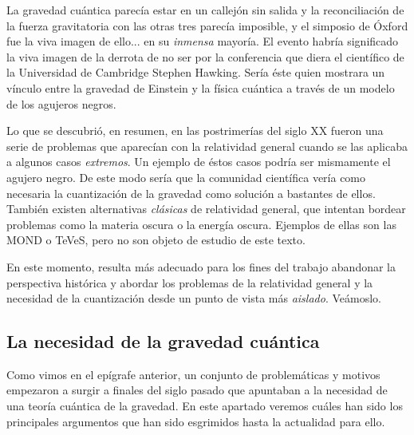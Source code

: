 \documentclass[11pt,a4paper,titlepage]{article}
\begin{document}
La gravedad cuántica parecía estar en un callejón sin salida y la reconciliación de la fuerza gravitatoria con las otras tres parecía imposible, y el simposio de Óxford fue la viva imagen de ello... en su \textit{inmensa} mayoría. El evento habría significado la viva imagen de la derrota de no ser por la conferencia que diera el científico de la Universidad de Cambridge Stephen Hawking. Sería éste quien mostrara un vínculo entre la gravedad de Einstein y la física cuántica a través de un modelo de los agujeros negros.

Lo que se descubrió, en resumen, en las postrimerías del siglo XX fueron una serie de problemas que aparecían con la relatividad general cuando se las aplicaba a algunos casos \textit{extremos}. Un ejemplo de éstos casos podría ser mismamente el agujero negro. De este modo sería que la comunidad científica vería como necesaria la cuantización de la gravedad como solución a bastantes de ellos. También existen alternativas \textit{clásicas} de relatividad general, que intentan bordear problemas como la materia oscura o la energía oscura. Ejemplos de ellas son las MOND o TeVeS, pero no son objeto de estudio de este texto.

En este momento, resulta más adecuado para los fines del trabajo abandonar la perspectiva histórica y abordar los problemas de la relatividad general y la necesidad de la cuantización desde un punto de vista más \textit{aislado}. Veámoslo.


\subsection{La necesidad de la gravedad cuántica}
\par Como vimos en el epígrafe anterior, un conjunto de problemáticas y motivos empezaron a surgir a finales del siglo pasado que apuntaban a la necesidad de una teoría cuántica de la gravedad. En este apartado veremos cuáles han sido los principales argumentos que han sido esgrimidos hasta la actualidad para ello.
\end{document}
